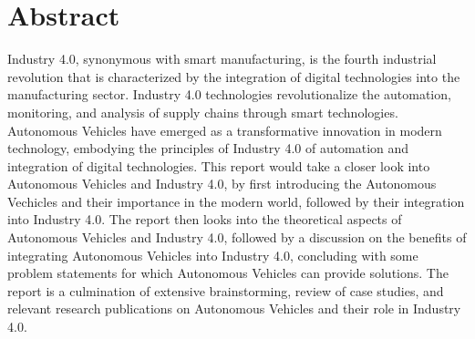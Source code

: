 \section{Abstract}

Industry 4.0, synonymous with smart manufacturing, is the fourth industrial revolution that is characterized by the integration of digital technologies into the manufacturing sector. Industry 4.0 technologies revolutionalize the automation, monitoring, and analysis of supply chains through smart technologies. Autonomous Vehicles have emerged as a transformative innovation in modern technology, embodying the principles of Industry 4.0 of automation and integration of digital technologies. This report would take a closer look into Autonomous Vehicles and Industry 4.0, by first introducing the Autonomous Vechicles and their importance in the modern world, followed by their integration into Industry 4.0. The report then looks into the theoretical aspects of Autonomous Vehicles and Industry 4.0, followed by a discussion on the benefits of integrating Autonomous Vehicles into Industry 4.0, concluding with some problem statements for which Autonomous Vehicles can provide solutions. The report is a culmination of extensive brainstorming, review of case studies, and relevant research publications on Autonomous Vehicles and their role in Industry 4.0.